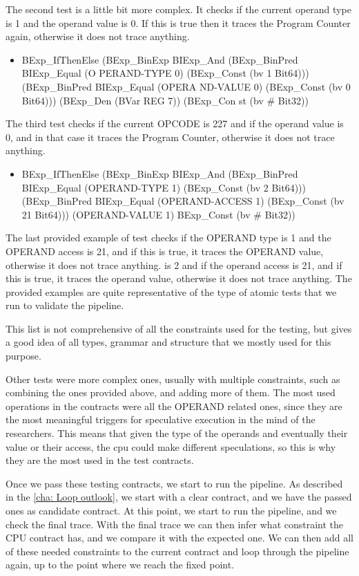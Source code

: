 The second test is a little bit more complex. It checks if the current operand
type is 1 and the operand value is 0. If this is true then it traces the Program
Counter again, otherwise it does not trace anything.

\begin{itemize}
  \item BExp\_IfThenElse (BExp\_BinExp BIExp\_And (BExp\_BinPred BIExp\_Equal (O
    PERAND-TYPE 0) (BExp\_Const (bv 1 Bit64))) (BExp\_BinPred BIExp\_Equal (OPERA
    ND-VALUE 0) (BExp\_Const (bv 0 Bit64))) (BExp\_Den (BVar REG 7)) (BExp\_Con st
    (bv \# Bit32))
\end{itemize}
The third test checks if the current OPCODE is 227 and if the operand value is 0,
and in that case it traces the Program Counter, otherwise it does not trace anything.

\begin{itemize}
  \item BExp\_IfThenElse (BExp\_BinExp BIExp\_And (BExp\_BinPred BIExp\_Equal (OPERAND-TYPE
    1) (BExp\_Const (bv 2 Bit64))) (BExp\_BinPred BIExp\_Equal (OPERAND-ACCESS 1)
    (BExp\_Const (bv 21 Bit64))) (OPERAND-VALUE 1) BExp\_Const (bv \# Bit32))
\end{itemize}

The last provided example of test checks if the OPERAND type is 1 and the
OPERAND access is 21, and if this is true, it traces the OPERAND value, otherwise
it does not trace anything. is 2 and if the operand access is 21, and if this is
true, it traces the operand value, otherwise it does not trace anything. The
provided examples are quite representative of the type of atomic tests that we
run to validate the pipeline.

This list is not comprehensive of all the constraints used for the testing, but gives
a good idea of all types, grammar and structure that we mostly used for this
purpose.

Other tests were more complex ones, usually with multiple constraints, such as
combining the ones provided above, and adding more of them. The most used
operations in the contracts were all the OPERAND related ones, since they are the
most meaningful triggers for speculative execution in the mind of the researchers.
This means that given the type of the operands and eventually their value or
their access, the cpu could make different speculations, so this is why they are
the most used in the test contracts.

Once we pass these testing contracts, we start to run the pipeline. As described
in the \cref{cha: Loop outlook}, we start with a clear contract, and we have the
passed ones as candidate contract. At this point, we start to run the pipeline, and
we check the final trace. With the final trace we can then infer what constraint
the CPU contract has, and we compare it with the expected one. We can then add
all of these needed constraints to the current contract and loop through the
pipeline again, up to the point where we reach the fixed point.

